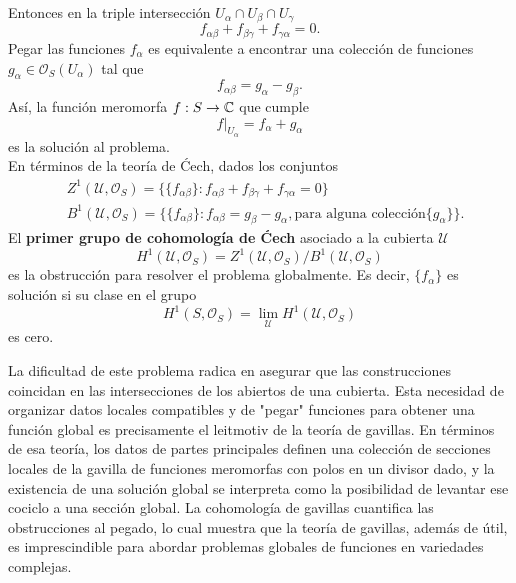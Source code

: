 	Entonces en la triple intersección $U_\alpha\cap U_\beta\cap U_\gamma$
	\begin{equation*}
			f_{\alpha\beta} + f_{\beta\gamma} + f_{\gamma\alpha}=0.
		\end{equation*}
	Pegar las funciones $f_\alpha$ es equivalente a encontrar una colección de funciones $g_\alpha\in\mathscr{O}_S(U_\alpha)$ tal que
	\begin{equation*}
			f_{\alpha\beta}=g_{\alpha}-g_{\beta}.
		\end{equation*}
	Así, la función meromorfa $f:S\to\mathbb{C}$ que cumple
	\begin{equation*}
			f|_{U_\alpha}=f_\alpha+g_\alpha
		\end{equation*}
	es la solución al problema.\\
	En términos de la teoría de Ćech, dados los conjuntos 
	\begin{align*}
			&Z^1(\mathscr{U},\mathscr{O}_S)=\{\{f_{\alpha\beta}\}:f_{\alpha\beta} + f_{\beta\gamma} + f_{\gamma\alpha}=0\}\\
			&B^1(\mathscr{U},\mathscr{O}_S)=\{\{f_{\alpha\beta}\}:f_{\alpha\beta} = g_{\beta} - g_{\alpha},\text{para alguna colección} \{g_\alpha\}\}.
		\end{align*}
	El \textbf{primer grupo de cohomología de Ćech} asociado a la cubierta $\mathscr{U}$
	\begin{equation*}
			H^1(\mathscr{U},\mathscr{O}_S)=Z^1(\mathscr{U},\mathscr{O}_S)/B^1(\mathscr{U},\mathscr{O}_S)
		\end{equation*}
	es la obstrucción para resolver el problema globalmente. Es decir, $\{f_\alpha\}$ es solución si su clase en el grupo
		\begin{equation*}
				H^1(S,\mathscr{O}_S)=\lim_{\mathscr{U}} H^1(\mathscr{U},\mathscr{O}_S)
			\end{equation*}
 	es cero.
 	
 	La dificultad de este problema radica en asegurar que las construcciones coincidan en las intersecciones de los abiertos de una cubierta. Esta necesidad de organizar datos locales compatibles y de "pegar" funciones para obtener una función global es precisamente el leitmotiv de la teoría de gavillas. En términos de esa teoría, los datos de partes principales definen una colección de secciones locales de la gavilla de funciones meromorfas con polos en un divisor dado, y la existencia de una solución global se interpreta como la posibilidad de levantar ese cociclo a una sección global. La cohomología de gavillas cuantifica las obstrucciones al pegado, lo cual muestra que la teoría de gavillas, además de útil, es imprescindible para abordar problemas globales de funciones en variedades complejas.
 	

